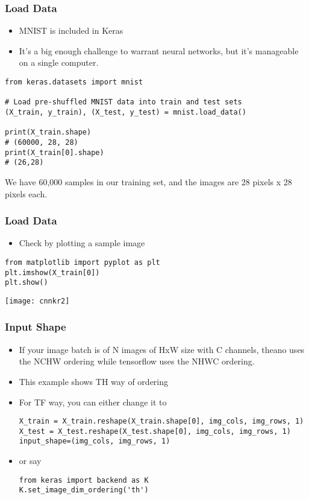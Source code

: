 \begin{frame}[fragile] \frametitle{Load Data}

\begin{itemize}
\item MNIST is included in Keras
\item It's a big enough challenge to warrant neural networks, but it's manageable on a single computer. 
\end{itemize}
\begin{lstlisting}
from keras.datasets import mnist
 
# Load pre-shuffled MNIST data into train and test sets
(X_train, y_train), (X_test, y_test) = mnist.load_data()

print(X_train.shape)
# (60000, 28, 28)
print(X_train[0].shape)
# (26,28)
\end{lstlisting}
We have 60,000 samples in our training set, and the images are 28 pixels x 28 pixels each.
\end{frame}

\begin{frame}[fragile] \frametitle{Load Data}

\begin{itemize}
\item Check by plotting a sample image
\end{itemize}
\begin{lstlisting}
from matplotlib import pyplot as plt
plt.imshow(X_train[0])
plt.show()
\end{lstlisting}
\begin{center}
\texttt{[image: cnnkr2]}
\end{center}
\end{frame}

\begin{frame}[fragile] \frametitle{Input Shape}

\begin{itemize}
\item If your image batch is of N images of HxW size with C channels, theano uses the NCHW ordering while tensorflow uses the NHWC ordering.
\item This example shows TH way of ordering
\item For TF way, you can either change it to 
\begin{lstlisting}
X_train = X_train.reshape(X_train.shape[0], img_cols, img_rows, 1)
X_test = X_test.reshape(X_test.shape[0], img_cols, img_rows, 1)
input_shape=(img_cols, img_rows, 1)
\end{lstlisting}
\item or say
\begin{lstlisting}
from keras import backend as K
K.set_image_dim_ordering('th')
\end{lstlisting}
\end{itemize}
\end{frame}



